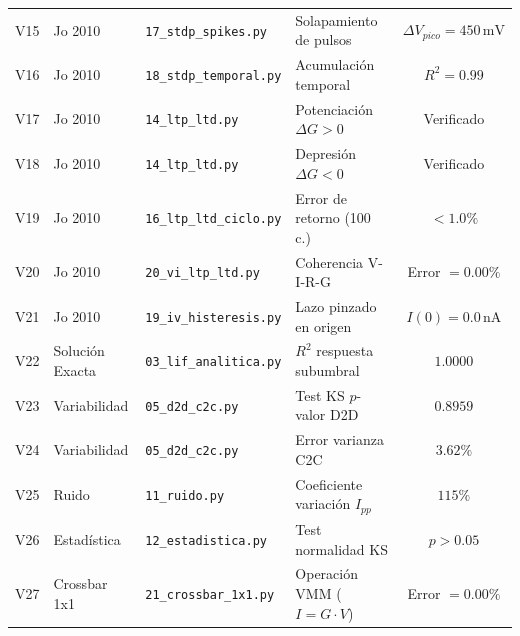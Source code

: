 {\begin{longtable}{c l l l c}
V15 & Jo 2010 & \texttt{17\_stdp\_spikes.py} & Solapamiento de pulsos & $\Delta V_{pico} = 450\,\mathrm{mV}$ \\
V16 & Jo 2010 & \texttt{18\_stdp\_temporal.py} & Acumulación temporal & $R^2 = 0.99$ \\
V17 & Jo 2010 & \texttt{14\_ltp\_ltd.py} & Potenciación $\Delta G > 0$ & Verificado \\
V18 & Jo 2010 & \texttt{14\_ltp\_ltd.py} & Depresión $\Delta G < 0$ & Verificado \\
V19 & Jo 2010 & \texttt{16\_ltp\_ltd\_ciclo.py} & Error de retorno (100 c.) & $< 1.0\%$ \\
V20 & Jo 2010 & \texttt{20\_vi\_ltp\_ltd.py} & Coherencia V-I-R-G & Error $= 0.00\%$ \\
V21 & Jo 2010 & \texttt{19\_iv\_histeresis.py} & Lazo pinzado en origen & $I(0) = 0.0\,\mathrm{nA}$ \\
V22 & Solución Exacta & \texttt{03\_lif\_analitica.py} & $R^2$ respuesta subumbral & $\mathbf{1.0000}$ \\
V23 & Variabilidad & \texttt{05\_d2d\_c2c.py} & Test KS $p$-valor D2D & $0.8959$ \\
V24 & Variabilidad & \texttt{05\_d2d\_c2c.py} & Error varianza C2C & $3.62\%$ \\
V25 & Ruido & \texttt{11\_ruido.py} & Coeficiente variación $I_{pp}$ & $115\%$ \\
V26 & Estadística & \texttt{12\_estadistica.py} & Test normalidad KS & $p > 0.05$ \\
V27 & Crossbar 1x1 & \texttt{21\_crossbar\_1x1.py} & Operación VMM ($I=G \cdot V$) & Error $= 0.00\%$ \\
\end{longtable}
}
